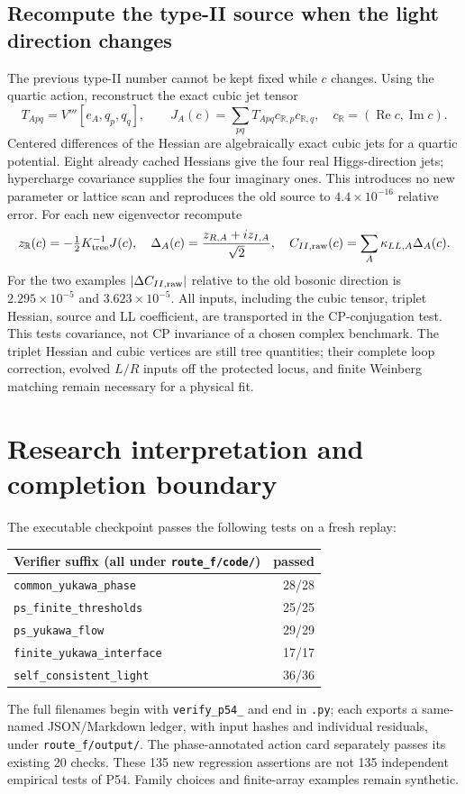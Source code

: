 \documentclass[11pt]{article}
\begin{document}
\subsection{Recompute the type-II source when the light direction changes}
The previous type-II number cannot be kept fixed while $c$ changes.
Using the quartic action, reconstruct the exact cubic jet tensor
\begin{equation}
T_{Apq}=V'''[e_A,q_p,q_q],\qquad
J_A(c)=\sum_{pq}T_{Apq}c_{\mathbb R,p}c_{\mathbb R,q},\quad
c_{\mathbb R}=(\operatorname{Re}c,\operatorname{Im}c).
\end{equation}
Centered differences of the Hessian are algebraically exact cubic jets
for a quartic potential. Eight already cached Hessians give the four real
Higgs-direction jets; hypercharge covariance supplies the four imaginary
ones. This introduces no new parameter or lattice scan and reproduces
the old source to $4.4\times10^{-16}$ relative error.
For each new eigenvector recompute
\begin{equation}
z_{\mathbb R}(c)=-\tfrac12K_{\rm tree}^{-1}J(c),\quad
\Delta_A(c)=\frac{z_{R,A}+iz_{I,A}}{\sqrt2},\quad
C_{II,\rm raw}(c)=\sum_A\kappa_{LL,A}\Delta_A(c).
\end{equation}
For the two examples $|\Delta C_{II,\rm raw}|$ relative to the old
bosonic direction is $2.295\times10^{-5}$ and $3.623\times10^{-5}$.
All inputs, including the cubic tensor, triplet Hessian, source and LL
coefficient, are transported in the CP-conjugation test. This tests
covariance, not CP invariance of a chosen complex benchmark.
The triplet Hessian and cubic vertices are still tree quantities;
their complete loop correction, evolved $L/R$ inputs off the protected
locus, and finite Weinberg matching remain necessary for a physical fit.

\section{Research interpretation and completion boundary}
The executable checkpoint passes the following tests on a fresh replay:
\begin{center}
\begin{tabular}{@{}lr@{}}
\toprule
Verifier suffix (all under \texttt{route\_f/code/})&passed\\\midrule
\texttt{common\_yukawa\_phase}&28/28\\
\texttt{ps\_finite\_thresholds}&25/25\\
\texttt{ps\_yukawa\_flow}&29/29\\
\texttt{finite\_yukawa\_interface}&17/17\\
\texttt{self\_consistent\_light}&36/36\\\bottomrule
\end{tabular}
\end{center}
The full filenames begin with \texttt{verify\_p54\_} and end in
\texttt{.py}; each exports a same-named JSON/Markdown ledger, with input
hashes and individual residuals, under \texttt{route\_f/output/}.
The phase-annotated action card separately passes its existing 20 checks.
These 135 new regression assertions are not 135 independent empirical
tests of P54. Family choices and finite-array examples remain synthetic.
\end{document}
